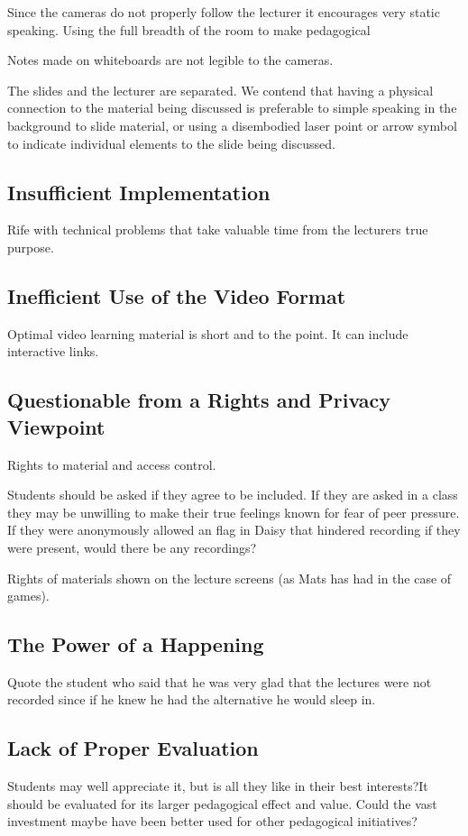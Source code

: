 \documentclass[a4paper,10pt]{article}
\begin{document}
Since the cameras do not properly follow the lecturer it encourages very static speaking. Using the full breadth of the room to make pedagogical 

Notes made on whiteboards are not legible to the cameras.

The slides and the lecturer are separated. We contend that having a physical connection to the material being discussed is preferable to simple speaking in the background to slide material, or using a disembodied laser point or arrow symbol to indicate individual elements to the slide being discussed. 

\subsection{Insufficient Implementation}
Rife with technical problems that take valuable time from the lecturers true purpose. 

\subsection{Inefficient Use of the Video Format}
Optimal video learning material is short and to the point. It can include interactive links.

\subsection{Questionable from a Rights and Privacy Viewpoint}
Rights to material and access control.

Students should be asked if they agree to be included. If they are asked in a class they may be unwilling to make their true feelings known for fear of peer pressure. If they were anonymously allowed an flag in Daisy that hindered recording if they were present, would there be any recordings?

Rights of materials shown on the lecture screens (as Mats has had in the case of games).

\subsection{The Power of a Happening}
Quote the student who said that he was very glad that the lectures were not recorded since if he knew he had the alternative he would sleep in. 

\subsection{Lack of Proper Evaluation}
Students may well appreciate it, but is all they like in their best interests?It should be evaluated for its larger pedagogical effect and value.
Could the vast investment maybe have been better used for other pedagogical initiatives?
\end{document}
